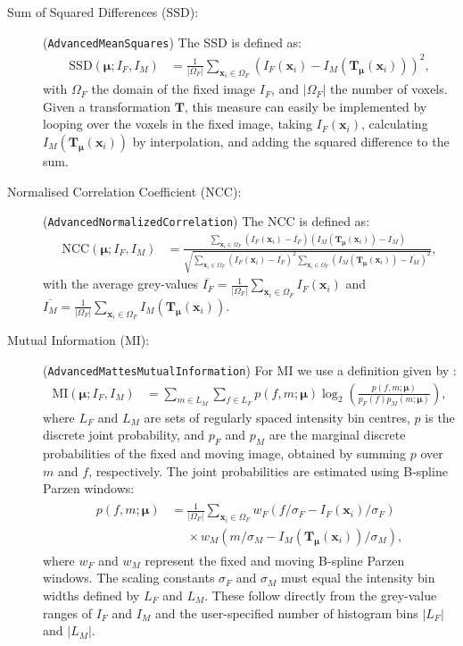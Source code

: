 \documentclass[]{report}
\newcommand{\vx}{\bm{x}}
\newcommand{\vmu}{\bm{\mu}}
\newcommand{\vT}{\bm{T}}
\newcommand{\vTm}{\bm{T}_{\vmu}}
\newcommand\relphantom[1]{\mathrel{\phantom{#1}}}
\begin{document}
\begin{description}
\item[Sum of Squared Differences (SSD):] (\texttt{AdvancedMeanSquares})
The SSD is defined as:
\begin{align}
\mathrm{SSD}(\vmu;I_F,I_M) &= \frac{1}{|\Omega_F|}
\sum\limits_{\vx_i \in \Omega_F} \left( I_F(\vx_i) -
I_M(\vT_{\vmu}(\vx_i)) \right)^2,\label{eq:ssd}
\end{align}
with $\Omega_F$ the domain of the fixed image $I_F$, and
$|\Omega_F|$ the number of voxels. Given a transformation $\vT$,
this measure can easily be implemented by looping over the voxels
in the fixed image, taking $I_F(\vx_i)$, calculating
$I_M(\vT_{\vmu}(\vx_i))$ by interpolation, and adding the squared
difference to the sum.

\item[Normalised Correlation Coefficient (NCC):]
(\texttt{AdvancedNormalizedCorrelation}) The NCC is defined as:
\begin{align}
\mathrm{NCC}(\vmu;I_F,I_M) &= \frac{ \sum\limits_{\vx_i \in \Omega_F}
\left( I_F(\vx_i) - \overline{I_F} \right) \left( I_M(\vTm(\vx_i)) -
\overline{I_M} \right) }{ \sqrt{\sum\limits_{\vx_i \in \Omega_F}
\left( I_F(\vx_i) - \overline{I_F} \right)^2 \sum\limits_{\vx_i \in
\Omega_F} \left( I_M(\vTm(\vx_i)) - \overline{I_M} \right)^2}
},\label{eq:ncc}
\end{align}
with the average grey-values
$\overline{I_F}=\frac{1}{|\Omega_F|}\sum\limits_{\vx_i \in
\Omega_F} I_F(\vx_i)$ and
$\overline{I_M}=\frac{1}{|\Omega_F|}\sum\limits_{\vx_i \in
\Omega_F} I_M(\vT_{\vmu}(\vx_i))$.

\item[Mutual Information (MI):] (\texttt{AdvancedMattesMutualInformation})
For MI \citep{MaesEA97,ViolaEA97,MattesEA03} we use a definition
given by \citet{ThevenazEA00a}:
\begin{align}
\mathrm{MI}(\vmu; I_F, I_M) &=
 \sum\limits_{m\in L_M} \sum\limits_{f\in L_F}
 p(f,m;\vmu) \log_2
 \left( \frac{ p(f,m;\vmu) }{ p_F(f) p_M(m;\vmu)  }
 \right),\label{eq:MI}
\end{align}
where $L_F$ and $L_M$ are sets of regularly spaced intensity bin
centres, $p$ is the discrete joint probability, and $p_F$ and
$p_M$ are the marginal discrete probabilities of the fixed and
moving image, obtained by summing $p$ over $m$ and $f$,
respectively. The joint probabilities are estimated using B-spline
Parzen windows:
\begin{align}
\begin{split}
 p(f,m;\vmu) &=  \frac{1}{|\Omega_F|} \sum\limits_{\vx_i \in \Omega_F}
 w_F( f/\sigma_F - I_F(\vx_i)/\sigma_F ) \\
 &\relphantom{=}\times w_M( m/\sigma_M - I_M(\vTm(\vx_i))/\sigma_M ),
\end{split} \label{eq:histogram}
\end{align}
where $w_F$ and $w_M$ represent the fixed and moving B-spline
Parzen windows. The scaling constants $\sigma_F$ and $\sigma_M$
must equal the intensity bin widths defined by $L_F$ and $L_M$.
These follow directly from the grey-value ranges of $I_F$ and
$I_M$ and the user-specified number of histogram bins $|L_F|$ and
$|L_M|$.


\end{description}
\end{document}
